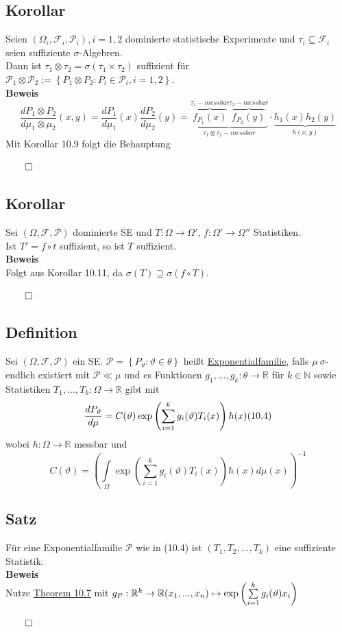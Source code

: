 \documentclass[german,10pt,oneside, fleqn, a4paper]{article}
\newcommand {\R}	{\mathbb{R}}
\newcommand {\N}	{\mathbb{N}}
\newcommand{\ra}{\rightarrow}
\newcommand{\sm}[2][\infty]{\sum\limits_{#2}^{#1}}
\newcommand{\brc}[1]{\left(#1\right)}
\newcommand{\brac}[1]{\left\lbrace #1\right\rbrace}
\newcommand{\QED}{\begin{flushright}$\qed$\end{flushright}}
\newcommand{\mc}[1]{\mathcal{#1}}
\newcommand{\beweis}{\textbf{Beweis}\\}
\newcommand{\1}[1]{1_{#1}}
\newcommand{\2}[1]{\1{\brac{#1}}}
\newcommand{\f}{\mc{F}}
\newcommand{\p}{\mc{P}}
\begin{document}
\subsection{Korollar}
\label{10.11}
Seien $(\Omega_i,\f_i,\p_i), i=1,2$ dominierte statistische Experimente und $\tau_i\subseteq\f_i$ seien suffiziente $\sigma$-Algebren. \\
Dann ist $\tau_1\otimes\tau_2=\sigma(\tau_1\times\tau_2)$ suffizient für \\
$\p_1\otimes\p_2:=\brac{P_1\otimes P_2:P_i\in\p_i, i=1,2}$.\\
\beweis
\[\dfrac{dP_1\otimes P_2}{d\mu_1\otimes\mu_2}(x,y)=\dfrac{dP_1}{d\mu_1}(x)\dfrac{dP_2}{d\mu_2}(y)=\underbrace{\overbrace{f_{P_1}(x)}^{\tau_1-messbar}\overbrace{f_{P_2}(y)}^{\tau_2-messbar}}_{\tau_1\otimes\tau_2-messbar}\cdot\underbrace{h_1(x)h_2(y)}_{h(x,y)}\]
Mit Korollar 10.9 folgt die Behauptung\QED

\subsection{Korollar}
\label{10.12}
Sei $(\Omega,\f,\p)$ dominierte SE und $T:\Omega\ra\Omega'$, $f:\Omega'\ra\Omega''$ Statistiken.\\
Ist $T'=f\circ t$ suffizient, so ist $T$ suffizient.\\
\beweis
Folgt aus Korollar 10.11, da $\sigma(T)\supseteq\sigma(f\circ T)$.\QED

\subsection{Definition}
\label{10.13}
Sei $(\Omega,\f,\p)$ ein SE. $\p=\brac{P_\vartheta:\vartheta\in\theta}$ heißt \underline{Exponentialfamilie}, falls $\mu\ \sigma$-endlich existiert mit $\p\ll\mu$ und es Funktionen $g_1,...,g_k:\theta\ra\R$ für $k\in\N$ sowie Statistiken $T_1,...,T_k:\Omega\ra\R$ gibt mit \[
\dfrac{dP_\vartheta}{d\mu}=C(\vartheta)\exp\brc{\sm[k]{i=1}g_i(\vartheta)T_i(x)}h(x)\hfill(10.4)\]
wobei $h:\Omega\ra\R$ messbar und\[
C(\vartheta)=\brc{\int\limits_\Omega\exp\brc{\sm[k]{i=1}g_i(\vartheta)T_i(x)}h(x)d\mu(x)}^{-1}\]

\subsection{Satz}
\label{10.14}
Für eine Exponentialfamilie $\p$ wie in (10.4) ist $(T_1,T_2,...,T_k)$ eine suffiziente Statistik.\\
\beweis
Nutze \hyperref[10.7]{Theorem 10.7} mit $\\
g_P:\R^k\ra\R\\
(x_1,...,x_n)\mapsto\exp\brc{\sm[k]{i=1}g_i(\vartheta)x_i}$\QED
\end{document}
